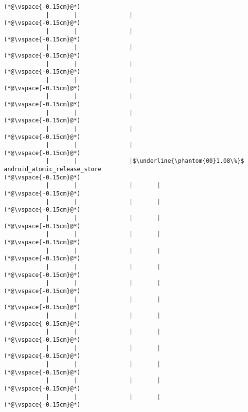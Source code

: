 \begin{lstlisting}[caption=Staattinen metodi Java$\to$C , label=profile:J2CBenchmark00001, numberbychapter=true, frame=lines, float, floatplacement=t]
(*@\vspace{-0.15cm}@*)
            |       |               |
(*@\vspace{-0.15cm}@*)
            |       |               |
(*@\vspace{-0.15cm}@*)
            |       |               |
(*@\vspace{-0.15cm}@*)
            |       |               |
(*@\vspace{-0.15cm}@*)
            |       |               |
(*@\vspace{-0.15cm}@*)
            |       |               |
(*@\vspace{-0.15cm}@*)
            |       |               |
(*@\vspace{-0.15cm}@*)
            |       |               |
(*@\vspace{-0.15cm}@*)
            |       |               |
(*@\vspace{-0.15cm}@*)
            |       |               |$\underline{\phantom{00}1.08\%}$ android_atomic_release_store
(*@\vspace{-0.15cm}@*)
            |       |               |       |
(*@\vspace{-0.15cm}@*)
            |       |               |       |
(*@\vspace{-0.15cm}@*)
            |       |               |       |
(*@\vspace{-0.15cm}@*)
            |       |               |       |
(*@\vspace{-0.15cm}@*)
            |       |               |       |
(*@\vspace{-0.15cm}@*)
            |       |               |       |
(*@\vspace{-0.15cm}@*)
            |       |               |       |
(*@\vspace{-0.15cm}@*)
            |       |               |       |
(*@\vspace{-0.15cm}@*)
            |       |               |       |
(*@\vspace{-0.15cm}@*)
            |       |               |       |
(*@\vspace{-0.15cm}@*)
            |       |               |       |
(*@\vspace{-0.15cm}@*)
            |       |               |       |
(*@\vspace{-0.15cm}@*)
            |       |               |       |
(*@\vspace{-0.15cm}@*)
            |       |               |       |
(*@\vspace{-0.15cm}@*)

\end{lstlisting}
